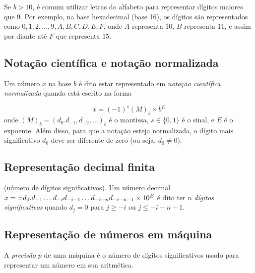 \documentclass{article}
\begin{document}
\begin{rem}
    Se \(b > 10\), é comum utilizar letras do alfabeto para representar dígitos maiores que 9. Por exemplo, na base hexadecimal (base 16), os dígitos são representados como \(0, 1, 2, \ldots, 9, A, B, C, D, E, F\), onde \(A\) representa 10, \(B\) representa 11, e assim por diante até \(F\) que representa 15.
\end{rem}

\subsection{Notação científica e notação normalizada}

\begin{defn}
    Um número \(x\) na base \(b\) é dito estar representado em \emph{notação científica normalizada} quando está escrito na forma

    \begin{equation}
        x = (-1)^s (M)_b \times b^E
    \end{equation}
    onde \((M)_b = (d_0. d_{-1}, d_{-2}, \ldots)_b\) é o mantissa, \(s \in \{0, 1\}\) é o sinal, e \(E\) é o expoente. Além disso, para que a notação esteja normalizada, o dígito mais significativo \(d_0\) deve ser diferente de zero (ou seja, \(d_0 \neq 0\)).
\end{defn}

\subsection{Representação decimal finita}

\begin{defn} (número de dígitos significativos).
    Um número decimal \(x = \pm d_0. d_{-1}\ldots d_{-i}\linebreak d_{-i-1}\ldots d_{-i-n}d_{-i-n-1} \times 10^E\) é dito ter \(n\) \emph{dígitos significativos} quando \(d_j = 0\) para \(j \geq -i\) ou \(j \leq -i-n-1\).
\end{defn}

\subsection{Representação de números em máquina}

\begin{defn}
    A \emph{precisão} \(p\) de uma máquina é o número de dígitos significativos usado para representar um número em sua aritmética.
\end{defn}
\end{document}
